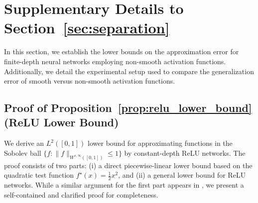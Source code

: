 \documentclass[11pt]{article}
\begin{document}
\section{Supplementary Details to Section~\ref{sec:separation}}
\label{app:separation}

In this section, we establish the lower bounds on the approximation error for finite-depth neural networks employing non-smooth activation functions. Additionally, we detail the experimental setup used to compare the generalization error of smooth versus non-smooth activation functions.


\subsection{Proof of Proposition~\ref{prop:relu_lower_bound} (ReLU Lower Bound)}
\label{app:lower-bound}


We derive an \(L^2([0,1])\) lower bound for approximating functions in the Sobolev ball
\(\{f:\|f\|_{W^{s,\infty}([0,1])}\le 1\}\) by constant-depth ReLU networks. The proof consists of two parts:
(i) a direct piecewise-linear lower bound based on the quadratic test function
\(f^\star(x)=\tfrac12 x^2\), and (ii) a general lower bound for ReLU networks. 
While a similar argument for the first part appears in \citet{yarotsky2017error}, we present a self-contained and clarified proof for completeness.

\end{document}
